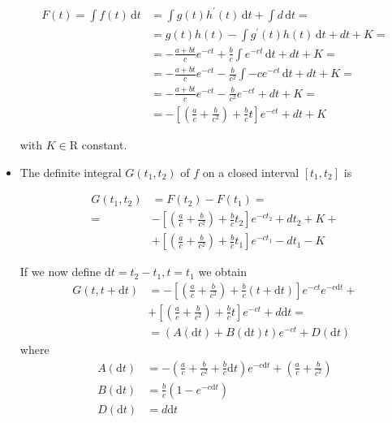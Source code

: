 \documentclass{article}
\begin{document}
\begin{appendices}
\begin{itemize}
\begin{equation}
\begin{split}
F(t)=\int f(t) \, \mathrm{d}t&=\int g(t)h^{\prime}(t) \, \mathrm{d}t + \int d \, \mathrm{d}t = \\
&=g(t)h(t) - \int g^{\prime}(t)h(t) \, \mathrm{d}t + dt + K=\\
&=-\frac{a + bt}{c}e^{-ct} + \frac{b}{c}\int e^{-ct} \, \mathrm{d}t + dt + K=\\
&=-\frac{a + bt}{c}e^{-ct} - \frac{b}{c^{2}}\int -ce^{-ct} \, \mathrm{d}t + dt + K=\\
&=-\frac{a + bt}{c}e^{-ct} - \frac{b}{c^{2}}e^{-ct} + dt + K =\\
&=-\left[\left( \frac{a}{c}+ \frac{b}{c^{2}}\right)+ \frac{b}{c} t\right]e^{-ct} + dt + K
\end{split}
\end{equation}

with $K\in{\mathrm{R}}$ constant.

\item The definite integral $G(t_{1},t_{2})$ of $f$ on a closed interval $[t_{1},t_{2}]$ is 

\begin{equation}
\begin{split}
G(t_{1},t_{2})&=F(t_{2})-F(t_{1})=\\
=&-\left[\left( \frac{a}{c}+ \frac{b}{c^{2}}\right)+ \frac{b}{c} t_{2}\right]e^{-ct_{2}} + dt_{2} + K +\\ 
&+\left[\left( \frac{a}{c}+ \frac{b}{c^{2}}\right)+ \frac{b}{c} t_{1}\right]e^{-ct_{1}} - dt_{1} - K
\end{split}
\end{equation}

If we now define $ \mathrm{d}t=t_{2}-t_{1},t=t_{1}$ we obtain
\begin{equation}
\begin{split}
G(t,t+\mathrm{d}t)&=-\left[\left( \frac{a}{c}+ \frac{b}{c^{2}}\right)+ \frac{b}{c}(t+\mathrm{d}t)\right]e^{-c t}e^{-c\mathrm{d}t}+\\ 
&+\left[\left( \frac{a}{c}+ \frac{b}{c^{2}}\right)+ \frac{b}{c} t\right]e^{-ct} + d\mathrm{d}t=\\
&=\left(A(\mathrm{d}t)+B(\mathrm{d}t)t\right)e^{-ct} + D(\mathrm{d}t)
\end{split}
\end{equation}
where
\begin{equation}
\begin{split}
A(\mathrm{d}t)&=-\left(\frac{a}{c}+ \frac{b}{c^{2}}+\frac{b}{c}\mathrm{d}t \right)e^{-c\mathrm{d}t}+\left(\frac{a}{c}+ \frac{b}{c^{2}}\right) \\
B(\mathrm{d}t)&=\frac{b}{c}\left(1-e^{-c\mathrm{d}t}\right) \\
D(\mathrm{d}t)&=d\mathrm{d}t
\end{split}
\end{equation}


\end{itemize}
\end{appendices}
\end{document}
